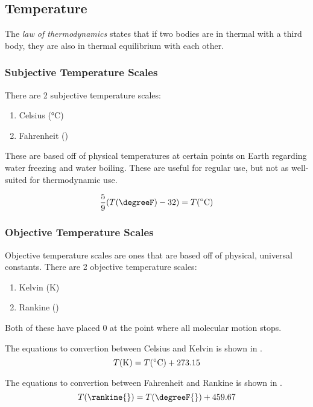 \subsection{Temperature}\label{subsec:Temperature}
\begin{definition}\label{def:0_Law_Thermo}
  The \emph{ law of thermodynamics} states that if two bodies are in thermal  with a third body, they are also in thermal equilibrium with each other.
\end{definition}

\subsubsection{Subjective Temperature Scales}\label{subsubsec:Subjective_Temp_Scales}
There are 2 subjective temperature scales:
\begin{enumerate}[noitemsep]
\item Celsius (\si{\degreeCelsius})
\item Fahrenheit (\si{\degreeF})
\end{enumerate}

These are based off of physical temperatures at certain points on Earth regarding water freezing and water boiling.
These are useful for regular use, but not as well-suited for thermodynamic use.

\begin{equation}\label{eq:Fahrenheit_Celsius}
  \frac{5}{9} (\Temp(\si{\degreeF}) - 32) = \Temp(\si{\degreeCelsius})
\end{equation}

\subsubsection{Objective Temperature Scales}\label{subsubsec:Objective_Temp_Scales}
Objective temperature scales are ones that are based off of physical, universal constants.
There are 2 objective temperature scales:
\begin{enumerate}[noitemsep]
\item Kelvin (\si{\kelvin})
\item Rankine (\si{\rankine})
\end{enumerate}

Both of these have placed $0$ at the point where all molecular motion stops.

The equations to convertion between Celsius and Kelvin is shown in .
\begin{equation}\label{eq:Celsius_Kelvin}
  \Temp(\si{\kelvin{}}) = \Temp(\si{\degreeCelsius}) + 273.15
\end{equation}

The equations to convertion between Fahrenheit and Rankine is shown in .
\begin{equation}\label{eq:Fahrenheit_Rankine}
  \Temp(\si{\rankine{}}) = \Temp(\si{\degreeF{}}) + 459.67
\end{equation}

